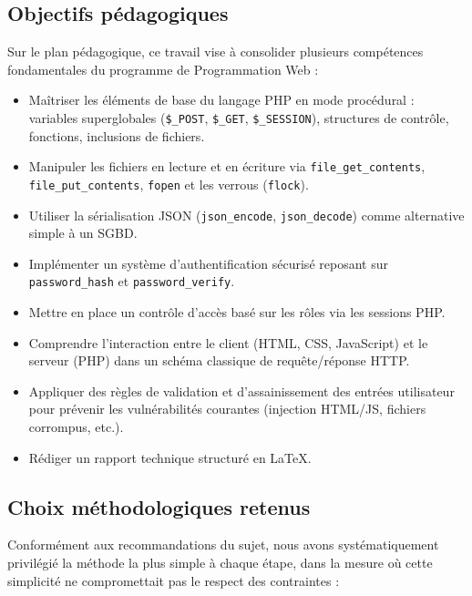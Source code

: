 \documentclass[12pt,a4paper]{article}
\begin{document}
\subsection{Objectifs pédagogiques}

Sur le plan pédagogique, ce travail vise à consolider plusieurs compétences fondamentales du programme de Programmation Web :

\begin{itemize}[leftmargin=1.5em]
    \item Maîtriser les éléments de base du langage PHP en mode procédural : variables superglobales (\texttt{\$\_POST}, \texttt{\$\_GET}, \texttt{\$\_SESSION}), structures de contrôle, fonctions, inclusions de fichiers.
    \item Manipuler les fichiers en lecture et en écriture via \texttt{file\_get\_contents}, \texttt{file\_put\_contents}, \texttt{fopen} et les verrous (\texttt{flock}).
    \item Utiliser la sérialisation JSON (\texttt{json\_encode}, \texttt{json\_decode}) comme alternative simple à un SGBD.
    \item Implémenter un système d'authentification sécurisé reposant sur \texttt{password\_hash} et \texttt{password\_verify}.
    \item Mettre en place un contrôle d'accès basé sur les rôles via les sessions PHP.
    \item Comprendre l'interaction entre le client (HTML, CSS, JavaScript) et le serveur (PHP) dans un schéma classique de requête/réponse HTTP.
    \item Appliquer des règles de validation et d'assainissement des entrées utilisateur pour prévenir les vulnérabilités courantes (injection HTML/JS, fichiers corrompus, etc.).
    \item Rédiger un rapport technique structuré en \LaTeX{}.
\end{itemize}

\subsection{Choix méthodologiques retenus}

Conformément aux recommandations du sujet, nous avons systématiquement privilégié la méthode la plus simple à chaque étape, dans la mesure où cette simplicité ne compromettait pas le respect des contraintes :
\end{document}
